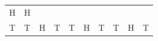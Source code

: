 {\begin{tabular}[t]{|l|l|l|l|l|l|l|l|l|l|}
        H &
        H%
     \tabularnewline\cline{1-1}\cline{2-2}\cline{3-3}\cline{4-4}\cline{5-5}\cline{6-6}\cline{7-7}\cline{8-8}\cline{9-9}\cline{10-10}
        T &
        T &
        H &
        T &
        T &
        H &
        T &
        T &
        H &
        T%

\end{tabular}}
